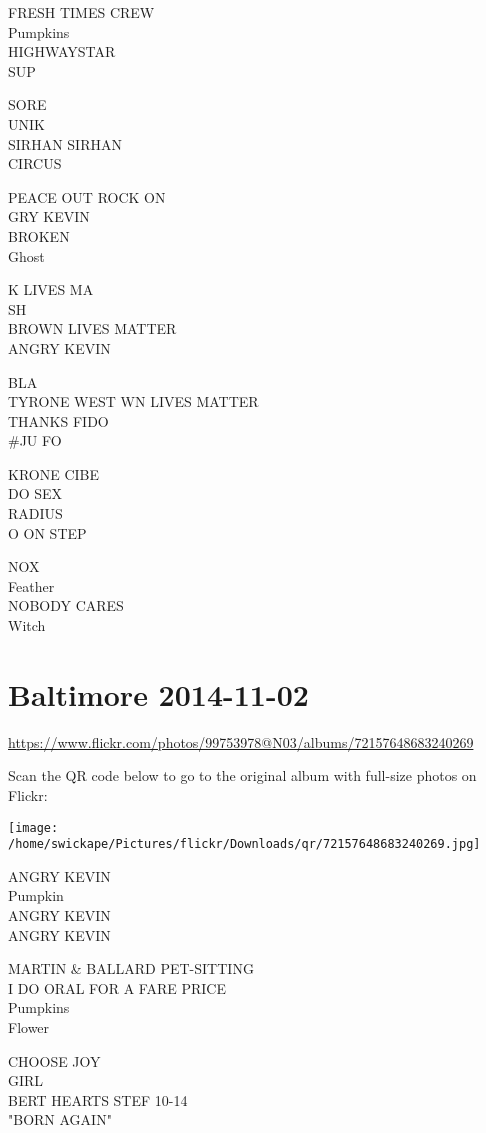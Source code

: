 \documentclass[10pt,letterpaper]{article}
\begin{document}
FRESH TIMES CREW\\
Pumpkins\\
HIGHWAYSTAR\\
SUP

SORE\\
UNIK\\
SIRHAN SIRHAN\\
CIRCUS

PEACE OUT ROCK ON\\
GRY KEVIN\\
BROKEN\\
Ghost

K LIVES MA\\
SH\\
BROWN LIVES MATTER\\
ANGRY KEVIN

BLA\\
TYRONE WEST WN LIVES MATTER\\
THANKS FIDO\\
\#JU FO

KRONE CIBE\\
DO SEX\\
RADIUS\\
O ON STEP

NOX\\
Feather\\
NOBODY CARES\\
Witch


\section*{Baltimore 2014-11-02}

\url{https://www.flickr.com/photos/99753978@N03/albums/72157648683240269}

Scan the QR code below to go to the original album with full-size photos on Flickr:

\texttt{[image: /home/swickape/Pictures/flickr/Downloads/qr/72157648683240269.jpg]}


ANGRY KEVIN\\
Pumpkin\\
ANGRY KEVIN\\
ANGRY KEVIN

MARTIN \& BALLARD PET{-}SITTING\\
I DO ORAL FOR A FARE PRICE\\
Pumpkins\\
Flower

CHOOSE JOY\\
GIRL\\
BERT HEARTS STEF 10{-}14\\
"BORN AGAIN"
\end{document}
